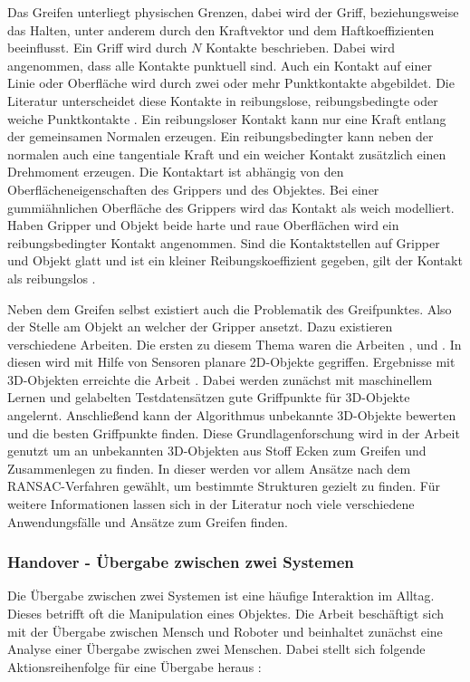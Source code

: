Das Greifen unterliegt physischen Grenzen, dabei wird der Griff, beziehungsweise das Halten, unter anderem durch den Kraftvektor und dem Haftkoeffizienten beeinflusst. Ein Griff wird durch $N$ Kontakte beschrieben. Dabei wird angenommen, dass alle Kontakte punktuell sind. Auch ein Kontakt auf einer Linie oder Oberfläche wird durch zwei oder mehr Punktkontakte abgebildet. Die Literatur unterscheidet diese Kontakte in reibungslose, reibungsbedingte oder weiche Punktkontakte \citep{salisbury1983kinematic}. Ein reibungsloser Kontakt kann nur eine Kraft entlang der gemeinsamen Normalen erzeugen. Ein reibungsbedingter kann neben der normalen auch eine tangentiale Kraft und ein weicher Kontakt zusätzlich einen Drehmoment erzeugen. Die Kontaktart ist abhängig von den Oberflächeneigenschaften des Grippers und des Objektes. Bei einer gummiähnlichen Oberfläche des Grippers wird das Kontakt als weich modelliert. Haben Gripper und Objekt beide harte und raue Oberflächen wird ein reibungsbedingter Kontakt angenommen. Sind die Kontaktstellen auf Gripper und Objekt glatt und ist ein kleiner Reibungskoeffizient gegeben, gilt der Kontakt als reibungslos \citep{bicchi2000robotic}.


Neben dem Greifen selbst existiert auch die Problematik des Greifpunktes. Also der Stelle am Objekt an welcher der Gripper ansetzt. Dazu existieren verschiedene Arbeiten. Die ersten zu diesem Thema waren die Arbeiten \cite{kamon1996learning}, \cite{coelho2001developing} und \cite{bowers2003manipulation}. In diesen wird mit Hilfe von Sensoren planare 2D-Objekte gegriffen. Ergebnisse mit 3D-Objekten erreichte die Arbeit \cite{saxena2008robotic}. Dabei werden zunächst mit maschinellem Lernen und gelabelten Testdatensätzen gute Griffpunkte für 3D-Objekte angelernt. Anschließend kann der Algorithmus unbekannte 3D-Objekte bewerten und die besten Griffpunkte finden. Diese Grundlagenforschung wird in der Arbeit \cite{maitin2010cloth} genutzt um an unbekannten 3D-Objekten aus Stoff Ecken zum Greifen und Zusammenlegen zu finden. In dieser werden vor allem Ansätze nach dem RANSAC-Verfahren gewählt, um bestimmte Strukturen gezielt zu finden. Für weitere Informationen lassen sich in der Literatur noch viele verschiedene Anwendungsfälle und Ansätze zum Greifen finden.

\subsubsection{Handover - Übergabe zwischen zwei Systemen}
Die Übergabe zwischen zwei Systemen ist eine häufige Interaktion im Alltag. Dieses betrifft oft die Manipulation eines Objektes. Die Arbeit \cite{huber2008human} beschäftigt sich mit der Übergabe zwischen Mensch und Roboter und beinhaltet zunächst eine Analyse einer Übergabe zwischen zwei Menschen. Dabei stellt sich folgende Aktionsreihenfolge für eine Übergabe heraus \citep{huber2008human}:

